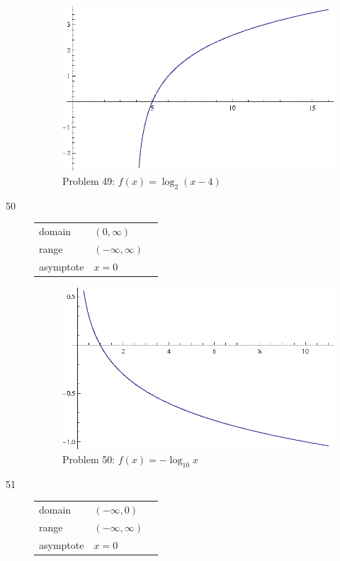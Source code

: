 \documentclass{exam}
\begin{document}
\begin{description}
      \begin{figure}[h]
        \centering
        \includegraphics[scale = 0.9]{problem49.eps}
        \caption{Problem 49: $f(x) = \log_2(x - 4)$}
      \end{figure}

    \item[50]
      \begin{tabular}[h]{lll}
        \toprule
        domain    & $(0, \infty)$ \\
        range     & $(-\infty, \infty)$ \\
        asymptote & $x = 0$ \\
        \bottomrule
      \end{tabular}

      \begin{figure}[h]
        \centering
        \includegraphics[scale = 0.9]{problem50.eps}
        \caption{Problem 50: $f(x) = -\log_{10} x$}
      \end{figure}

    \item[51]
      \begin{tabular}[h]{lll}
        \toprule
        domain    & $(-\infty, 0)$ \\
        range     & $(-\infty, \infty)$ \\
        asymptote & $x = 0$ \\
        \bottomrule
      \end{tabular}


\end{description}
\end{document}
